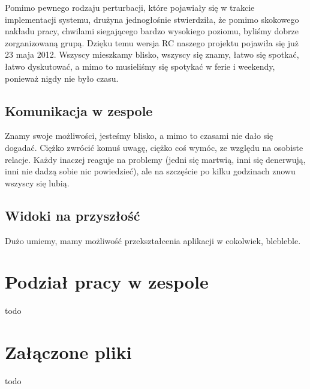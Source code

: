 \documentclass[licencjacka]{pracamgr}
\begin{document}
Pomimo pewnego rodzaju perturbacji, które pojawiały się w trakcie implementacji systemu, drużyna jednogłośnie stwierdziła,
że pomimo skokowego nakładu pracy, chwilami siegającego bardzo wysokiego poziomu, byliśmy dobrze zorganizowaną grupą.
Dzięku temu wersja RC naszego projektu pojawiła się już 23 maja 2012. 
Wszyscy mieszkamy blisko, wszyscy się znamy, łatwo się spotkać, łatwo dyskutować, a mimo to musieliśmy się spotykać w ferie i weekendy, ponieważ nigdy nie było czasu.
\section{Komunikacja w zespole}
Znamy swoje możliwości, jesteśmy blisko, a mimo to czasami nie dało się dogadać. Ciężko zwrócić komuś uwagę, ciężko coś wymóc, ze względu na osobiste relacje. Każdy inaczej reaguje na problemy (jedni się martwią, inni się denerwują, inni nie dadzą sobie nic powiedzieć), ale na szczęście po kilku godzinach znowu wszyscy się lubią. 
\section{Widoki na przyszłość}
Dużo umiemy, mamy możliwość przekształcenia aplikacji w cokolwiek, blebleble.
\chapter{Podział pracy w zespole}
todo

\chapter{Załączone pliki}
todo
\end{document}
